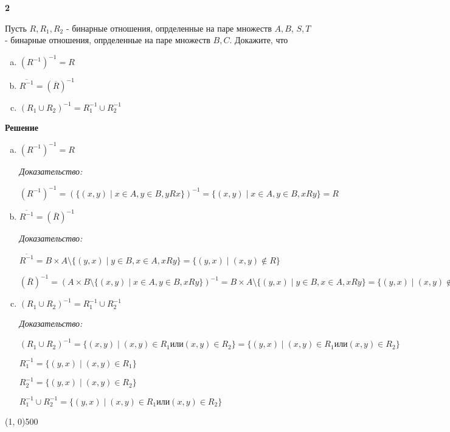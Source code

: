 \documentclass{article}
\begin{document}
\textbf{2} 

Пусть $R, R_1, R_2$ - бинарные отношения, опрделенные на паре множеств $A, B$, $S, T$ - бинарные отношения, опрделенные на паре множеств $B,C$. Докажите, что

\begin{enumerate}[(a)]
    \item $(R^{-1})^{-1} = R$
    \item $\overline{R^{-1}} = (\overline{R})^{-1}$
    \item $(R_1 \cup R_2)^{-1} = R_1^{-1} \cup R_2^{-1}$
\end{enumerate}

\textbf{Решение}

\begin{enumerate}[(a)]
    \item $(R^{-1})^{-1} = R$
    
    \textit{Доказательство:}
     
    $(R^{-1})^{-1} = (\{ (x, y) \mid x \in A, y \in B, yRx\})^{-1} = \{ (x, y) \mid x \in A, y \in B, xRy\} = R $
    
    \item $\overline{R^{-1}} = (\overline{R})^{-1}$
    
    \textit{Доказательство:}
    
    $\overline{R^{-1}} = B \times A \setminus \{ (y, x) \mid y \in B, x \in A, xRy \} = \{(y, x) \mid (x,y) \notin R \}$
    
    $(\overline{R})^{-1} = ( A \times B \setminus \{ (x, y) \mid x \in A, y \in B, xRy\})^{-1} = B \times A \setminus \{ (y, x) \mid y \in B, x \in A, xRy \} =  \{(y, x) \mid (x,y) \notin R \} $
    
    \item $(R_1 \cup R_2)^{-1} = R_1^{-1} \cup R_2^{-1}$
    
    \textit{Доказательство:}
    
    $(R_1 \cup R_2)^{-1} = \{ (x, y) \mid (x,y) \in R_1 \text{или}  (x,y) \in R_2 \} = \{ (y, x) \mid (x,y) \in R_1 \text{или}  (x,y) \in R_2 \} $ 
    
    $R_1^{-1} = \{(y, x) \mid (x,y) \in R_1\}$
    
    $R_2^{-1} = \{(y, x) \mid (x,y) \in R_2\}$
    
    $R_1^{-1} \cup R_2^{-1} = \{ (y, x) \mid (x,y) \in R_1 \text{или}  (x,y) \in R_2 \}$
    
\end{enumerate}

\line(1, 0){500}
\end{document}
